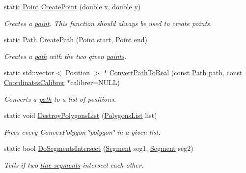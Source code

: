 \begin{DoxyCompactItemize}
\item 
static \hyperlink{structPathFinder_1_1Point}{Point} \hyperlink{classPathFinder_a457592f3579bbe0c0527360c2c8a928a}{CreatePoint} (double x, double y)
\begin{DoxyCompactList}\small\item\em Creates a \hyperlink{structPathFinder_1_1Point}{point}. This function should always be used to create points. \item\end{DoxyCompactList}\item 
static \hyperlink{classPathFinder_a269aba09b7b3208092f67f2bc02cf63e}{Path} \hyperlink{classPathFinder_a42e557e3fe4cd1b209a4722ecfbf876b}{CreatePath} (\hyperlink{structPathFinder_1_1Point}{Point} start, \hyperlink{structPathFinder_1_1Point}{Point} end)
\begin{DoxyCompactList}\small\item\em Creates a \hyperlink{classPathFinder_a269aba09b7b3208092f67f2bc02cf63e}{path} with the two given \hyperlink{structPathFinder_1_1Point}{points}. \item\end{DoxyCompactList}\item 
static std::vector$<$ Position $>$ $\ast$ \hyperlink{classPathFinder_aba7f833c9bb8de011c62a1f01fb26144}{ConvertPathToReal} (const \hyperlink{classPathFinder_a269aba09b7b3208092f67f2bc02cf63e}{Path} path, const \hyperlink{classCoordinatesCalibrer}{CoordinatesCalibrer} $\ast$calibrer=NULL)
\begin{DoxyCompactList}\small\item\em Converts a \hyperlink{classPathFinder_a269aba09b7b3208092f67f2bc02cf63e}{path} to a list of positions. \item\end{DoxyCompactList}\item 
static void \hyperlink{classPathFinder_a3306e3d1bb0ae88e236eb7cabbfce835}{DestroyPolygonsList} (\hyperlink{classPathFinder_a16ed073fa542c82fd09e582cb4fbed24}{PolygonsList} list)
\begin{DoxyCompactList}\small\item\em Frees every ConvexPolygon \char`\"{}polygon\char`\"{} in a given list. \item\end{DoxyCompactList}\item 
static bool \hyperlink{classPathFinder_a87a4f6d236e4b386e8b727e465f802be}{DoSegmentsIntersect} (\hyperlink{structPathFinder_1_1Segment}{Segment} seg1, \hyperlink{structPathFinder_1_1Segment}{Segment} seg2)
\begin{DoxyCompactList}\small\item\em Tells if two \hyperlink{structPathFinder_1_1Segment}{line segments} intersect each other. \item\end{DoxyCompactList}\end{DoxyCompactItemize}
